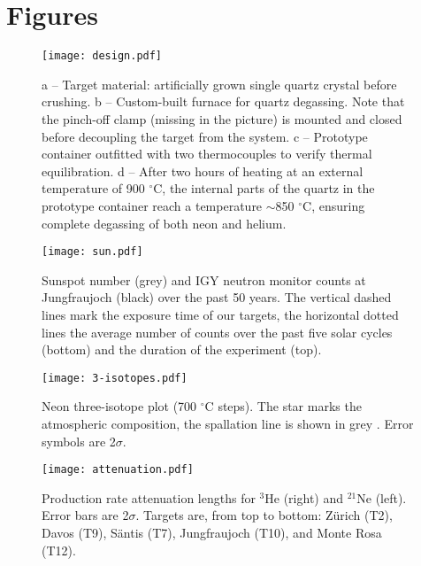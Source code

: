 \documentclass{article}
\begin{document}
\section*{Figures}

\begin{figure}[h]
  \centering
  \texttt{[image: design.pdf]}
  \caption{
a -- Target material: artificially grown single 
    quartz  crystal before  crushing.  b  -- Custom-built  furnace for
    quartz degassing.   Note that the pinch-off clamp  (missing in the
    picture) is  mounted and closed before decoupling  the target from
    the  system.    c  --  Prototype  container   outfitted  with  two
    thermocouples  to verify  thermal  equilibration. d  -- After  two
    hours of  heating at an  external temperature of  900 $^{\circ}$C,
    the internal parts of the  quartz in the prototype container reach
    a temperature  $\sim$850 $^{\circ}$C, ensuring  complete degassing
    of both neon and helium.}
  \label{fig:design}
\end{figure}

\clearpage
\begin{figure}[htbp]
  \centering
  \texttt{[image: sun.pdf]}
  \caption{Sunspot  number (grey)  and IGY  neutron monitor  counts at
    Jungfraujoch (black) over the  past 50 years.  The vertical dashed
    lines mark the exposure time of our targets, the horizontal dotted
    lines the average number of counts over the past five solar cycles
    (bottom) and the duration of the experiment (top).}
  \label{fig:sun}
\end{figure}

\clearpage
\begin{figure}[htbp]
  \centering
  \texttt{[image: 3-isotopes.pdf]}
  \caption{Neon three-isotope plot (700 $^{\circ}$C steps). 
The star marks the atmospheric composition,
    the spallation line is shown in grey \citep{niedermann2002}. Error
    symbols are 2$\sigma$.}
  \label{fig:3-isotopes}
\end{figure}

\clearpage
\begin{figure}[htbp]
  \centering
  \texttt{[image: attenuation.pdf]}
  \caption{Production rate attenuation lengths for $^3$He (right) and $^{21}$Ne (left).
    Error  bars  are  2$\sigma$.  Targets  are, from  top  to  bottom:
    Z\"{u}rich (T2), Davos  (T9), S\"{a}ntis (T7), Jungfraujoch (T10),
    and Monte Rosa (T12).}
  \label{fig:attenuation}
\end{figure}
\end{document}
